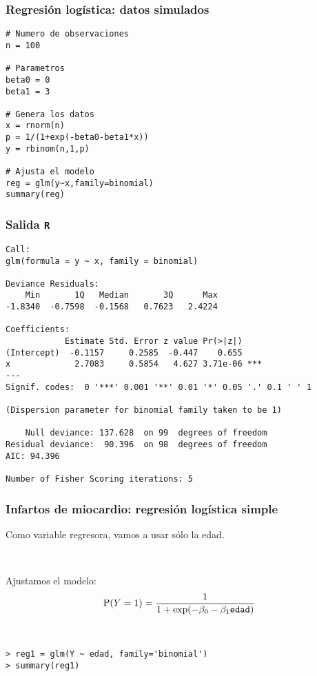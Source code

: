 \documentclass{beamer}
\begin{document}
\begin{frame}
\frametitle{Regresión logística: datos simulados}

\begin{verbatim}
# Numero de observaciones
n = 100

# Parametros
beta0 = 0
beta1 = 3

# Genera los datos
x = rnorm(n)
p = 1/(1+exp(-beta0-beta1*x))
y = rbinom(n,1,p)

# Ajusta el modelo
reg = glm(y~x,family=binomial)
summary(reg)
\end{verbatim}

\end{frame}
\begin{frame}
\frametitle{Salida {\tt R}}

{\scriptsize
\begin{verbatim}
Call:
glm(formula = y ~ x, family = binomial)

Deviance Residuals:
    Min       1Q   Median       3Q      Max
-1.8340  -0.7598  -0.1568   0.7623   2.4224

Coefficients:
            Estimate Std. Error z value Pr(>|z|)
(Intercept)  -0.1157     0.2585  -0.447    0.655
x             2.7083     0.5854   4.627 3.71e-06 ***
---
Signif. codes:  0 '***' 0.001 '**' 0.01 '*' 0.05 '.' 0.1 ' ' 1

(Dispersion parameter for binomial family taken to be 1)

    Null deviance: 137.628  on 99  degrees of freedom
Residual deviance:  90.396  on 98  degrees of freedom
AIC: 94.396

Number of Fisher Scoring iterations: 5
\end{verbatim}
}

\end{frame}
\begin{frame}
\frametitle{Infartos de miocardio: regresión logística simple}

Como variable regresora, vamos a usar s\'{o}lo la edad.

\

Ajustamos el modelo:
\[
\mbox{P}(Y=1) =
\frac{1}{1+\exp(-\beta_0-\beta_1\mbox{{\tt edad}})}
\]

\

\begin{verbatim}
> reg1 = glm(Y ~ edad, family='binomial')
> summary(reg1)
\end{verbatim}

\end{frame}
\end{document}
